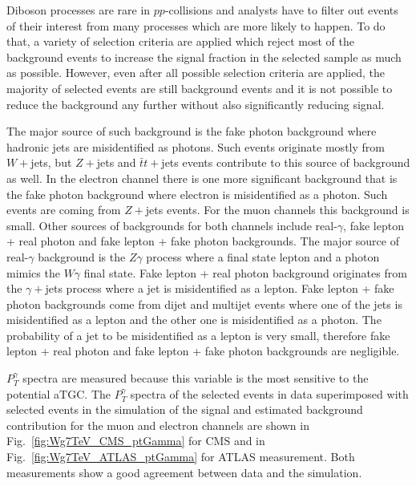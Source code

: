 Diboson processes are rare in $pp$-collisions and analysts have to filter out events of their interest from many processes which are more likely to happen. To do that, a variety of selection criteria are applied which reject most of the background events to increase the signal fraction in the selected sample as much as possible. However, even after all possible selection criteria are applied, the majority of selected events are still background events and it is not possible to reduce the background any further without also significantly reducing signal.

The major source of such background is the fake photon background where hadronic jets are misidentified as photons. Such events originate mostly from $W+$jets, but $Z+$jets and $\bar{t}t+$jets events contribute to this source of background as well. In the electron channel there is one more significant background that is the fake photon background where electron is misidentified as a photon.  Such events are coming from $Z+$jets events. For the muon channels this background is small. Other sources of backgrounds for both channels include real-$\gamma$, fake lepton + real photon and fake lepton + fake photon backgrounds. The major source of real-$\gamma$ background is the $Z\gamma$ process where a final state lepton and a photon mimics the $W\gamma$ final state. Fake lepton + real photon background originates from the $\gamma+$jets process where a jet is misidentified as a lepton. Fake lepton + fake photon backgrounds come from dijet and multijet events where one of the jets is misidentified as a lepton and the other one is misidentified as a photon. The probability of a jet to be misidentified as a lepton is very small, therefore fake lepton + real photon and fake lepton + fake photon backgrounds are negligible.

$P_T^\gamma$ spectra are measured because this variable is the most sensitive to the potential aTGC. The $P_T^\gamma$ spectra of the selected events in data superimposed with selected events in the simulation of the signal and estimated background contribution for the muon and electron channels are shown in Fig.~\ref{fig:Wg7TeV_CMS_ptGamma} for CMS and in Fig.~\ref{fig:Wg7TeV_ATLAS_ptGamma} for ATLAS measurement. Both measurements show a good agreement between data and the simulation.

